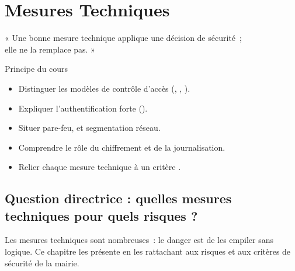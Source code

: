 
\chapter{Mesures Techniques}
\label{chap:technique}

\epigraph{%
    « Une bonne mesure technique applique une décision de sécurité~;\\
    elle ne la remplace pas. »%
}{Principe du cours}


\begin{boxobjectifs}
\begin{itemize}
    \item Distinguer les modèles de contrôle d'accès (, ,
          ).
    \item Expliquer l'authentification forte ().
    \item Situer pare-feu,  et segmentation réseau.
    \item Comprendre le rôle du chiffrement et de la journalisation.
    \item Relier chaque mesure technique à un critère .
\end{itemize}
\end{boxobjectifs}

\bigskip

\section*{Question directrice : quelles mesures techniques pour quels risques ?}

Les mesures techniques sont nombreuses~: le danger est de les empiler sans
logique. Ce chapitre les présente en les rattachant aux risques et aux critères
de sécurité de la mairie.

